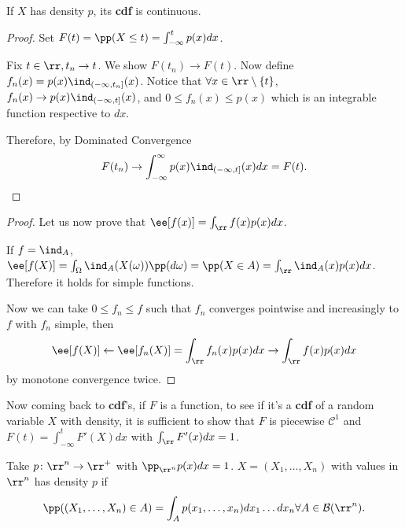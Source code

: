 \documentclass[../main.tex]{subfiles}
\begin{document}
\begin{proposition}
  If $X$ has density $p$, its \textbf{cdf} is continuous. 
\end{proposition}
\begin{proof}
  Set $F(t) = \pp(X \leq t) = \int_{-\infty}^t p(x)dx$. 
  \vspace{0.3em}

  Fix $t \in \rr, t_n \to t$. We show $F(t_n) \to F(t)$. Now define $f_n(x) = p(x) 
  \ind_{(-\infty,t_n]}(x)$. Notice that $\forall x \in \rr \setminus \{t\}$, 
  $f_n(x) \to p(x) \ind_{(-\infty, t]}(x)$, and $0 \leq f_n(x) \leq p(x)$ which is 
  an integrable function respective to $dx$.

  \vspace{0.3em}

  Therefore, by Dominated Convergence
  \[
    F(t_n) \to \int_{-\infty}^\infty p(x) \ind_{(-\infty, t]}(x)dx = F(t)
  .\] 
\end{proof}

\begin{proof}
Let us now prove that $\ee[f(x)] = \int_{\rr} f(x)p(x)dx$.
\vspace{0.3em}

If $f = \ind_{A}$, $\ee[f(X)] = \int_{\Omega}\ind_{A}(X(\omega))\pp(d\omega) = 
\pp(X \in A) = \int_{\rr} \ind_{A}(x)p(x)dx$. Therefore it holds for
simple functions. 

\vspace{0.3em}

Now we can take $0 \leq f_n \leq f$ such that $f_n$ converges
pointwise and increasingly to $f$ with $f_n$ simple, then 
\[
  \ee[f(X)] \gets \ee[f_n(X)] = \int_{\rr} f_n(x)p(x)dx \to
  \int_{\rr}f(x)p(x)dx
\]
by monotone convergence twice.
\end{proof}

Now coming back to \textbf{cdf}'s, if $F$ is a function, to see if it's a
\textbf{cdf} of a random variable $X$ with density, it is sufficient
to show that $F$ is piecewise $\mathcal{C}^1$ and $F(t) =
\int_{-\infty}^t F'(X)dx$ with $\int_{\rr}F'(x)dx = 1$.

\begin{definition}
  [Density in $\rr^n$] Take $p \colon \rr^n \to \rr^+$ with
  $\pp_{\rr^n}p(x)dx = 1$. $X = (X_1, \ldots, X_n)$ with values in
  $\rr^n$ has density $p$ if
  \[
    \pp((X_1, \ldots, X_n) \in A) = \int_{A} p(x_1,\ldots,
    x_n)dx_1 \ldots dx_n \forall A \in \mathcal{B}(\rr^n)
  .\]
\end{definition}
\end{document}
